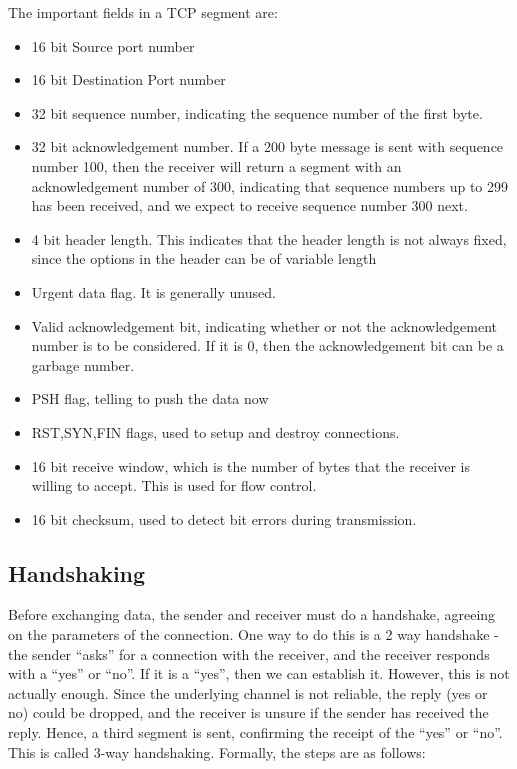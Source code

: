 \documentclass[12pt,letterpaper]{amsbook}
\theoremstyle{definition}
\begin{document}
The important fields in a TCP segment are:

\begin{itemize}
  \item 16 bit Source port number
  \item 16 bit Destination Port number
  \item 32 bit sequence number, indicating the sequence number of the first byte.
  \item 32 bit acknowledgement number. If a 200 byte message is sent with sequence number 100, then the receiver will return a segment with an acknowledgement number of 300, indicating that sequence numbers up to 299 has been received, and we expect to receive sequence number 300 next.
  \item 4 bit header length. This indicates that the header length is not always fixed, since the options in the header can be of variable length
  \item Urgent data flag. It is generally unused.
  \item Valid acknowledgement bit, indicating whether or not the acknowledgement number is to be considered. If it is 0, then the acknowledgement bit can be a garbage number.
  \item PSH flag, telling to push the data now
  \item RST,SYN,FIN flags, used to setup and destroy connections.
  \item 16 bit receive window, which is the number of bytes that the receiver is willing to accept. This is used for flow control.
  \item 16 bit checksum, used to detect bit errors during transmission.
\end{itemize}

\subsection{Handshaking}

Before exchanging data, the sender and receiver must do a handshake, agreeing on the parameters of the connection. One way to do this is a 2 way handshake - the sender ``asks'' for a connection with the receiver, and the receiver responds with a ``yes'' or ``no''. If it is a ``yes'', then we can establish it. However, this is not actually enough. Since the underlying channel is not reliable, the reply (yes or no) could be dropped, and the receiver is unsure if the sender has received the reply. Hence, a third segment is sent, confirming the receipt of the ``yes'' or ``no''. This is called 3-way handshaking. Formally, the steps are as follows:
\end{document}
